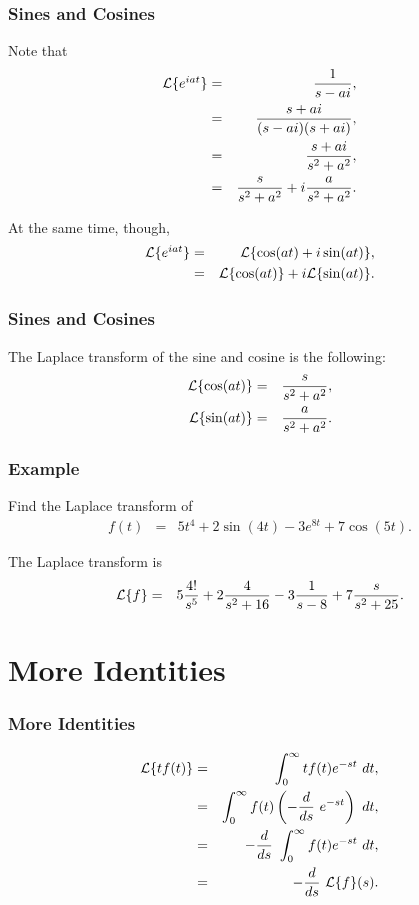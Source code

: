 \begin{frame}
  \frametitle{Sines and Cosines}

  Note that
  \begin{eqnarray*}
    \laplace{e^{iat}} & = & \frac{1}{s-ai}, \\
    & = & \frac{s+ai}{(s-ai)(s+ai)}, \\
    & = & \frac{s+ai}{s^2+a^2}, \\
    & = & \frac{s}{s^2+a^2} + i \frac{a}{s^2+a^2}.
  \end{eqnarray*}

  At the same time, though,
  \begin{eqnarray*}
    \laplace{e^{iat}} & = & \laplace{\cos(at) + i \sin(at)}, \\
    & = & \laplace{\cos(at)} + i \laplace{\sin(at)}.
  \end{eqnarray*}


\end{frame}


\begin{frame}
  \frametitle{Sines and Cosines}

  The Laplace transform of the sine and cosine is the following:
  \begin{eqnarray*}
    \laplace{\cos(at)} & = & \frac{s}{s^2+a^2}, \\
    \laplace{\sin(at)} & = & \frac{a}{s^2+a^2}.
  \end{eqnarray*}


\end{frame}


\begin{frame}
  \frametitle{Example}

  Find the Laplace transform of 
  \begin{eqnarray*}
    f(t) & = & 5t^4 + 2\sin(4t) - 3 e^{8t} + 7 \cos(5t).
  \end{eqnarray*}

  The Laplace transform is
  \begin{eqnarray*}
    \laplace{f} & = & 5 \frac{4!}{s^5} + 2 \frac{4}{s^2+16}  - 3\frac{1}{s-8} + 7 \frac{s}{s^2+25}.
  \end{eqnarray*}

\end{frame}

\section{More Identities}

\begin{frame}
  \frametitle{More Identities}

  \begin{eqnarray*}
    \laplace{t f(t)} & = & \int^\infty_0 t f(t) e^{-st} ~ dt, \\
    & = & \int^\infty_0 f(t) \lp -\deriv{~}{s} e^{-st} \rp ~ dt, \\
    & = & -\deriv{~}{s} \int^\infty_0 f(t) e^{-st}  ~ dt, \\
    & = & -\deriv{~}{s} \laplace{f}(s).
  \end{eqnarray*}

\end{frame}

